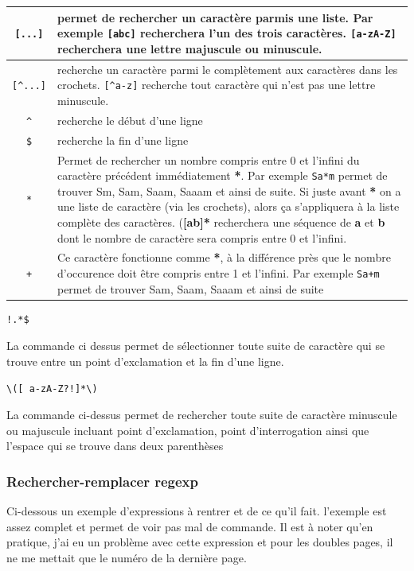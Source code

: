 \documentclass[a4paper,twoside]{article}
\begin{document}
\begin{center}
\begin{tabular}[c]{|c|p{14cm}|}
\verb|[...]| &  permet de rechercher un caractère parmis une liste. Par exemple \verb|[abc]| recherchera l'un des trois caractères. \verb|[a-zA-Z]| recherchera une lettre majuscule ou minuscule.\\ \hline
\verb|[^...]| & recherche un caractère parmi le complètement aux caractères dans les crochets. \verb|[^a-z]| recherche tout caractère qui n'est pas une lettre minuscule. \\ \hline
\verb|^| &  recherche le début d'une ligne\\ \hline
\verb|$| &  recherche la fin d'une ligne\\ \hline
\verb|*| &  Permet de rechercher un nombre compris entre 0 et l'infini du caractère précédent immédiatement \textbf{*}. Par exemple \verb|Sa*m| permet de trouver Sm, Sam, Saam, Saaam et ainsi de suite. Si juste avant \textbf{*} on a une liste de caractère (via les crochets), alors ça s'appliquera à la liste complète des caractères. (\textbf{[ab]*} recherchera une séquence de \textbf{a} et \textbf{b} dont le nombre de caractère sera compris entre 0 et l'infini.\\ \hline
\verb|+| & Ce caractère fonctionne comme \textbf{*}, à la différence près que le nombre d'occurence doit être compris entre 1 et l'infini. Par exemple \verb|Sa+m| permet de trouver Sam, Saam, Saaam et ainsi de suite\\\hline
\end{tabular}
\end{center}


\begin{verbatim}
!.*$
\end{verbatim}

La commande ci dessus permet de sélectionner toute suite de caractère qui se trouve entre un point d'exclamation et la fin d'une ligne.

\begin{verbatim}
\([ a-zA-Z?!]*\)
\end{verbatim}

La commande ci-dessus permet de rechercher toute suite de caractère minuscule ou majuscule incluant point d'exclamation, point d'interrogation ainsi que l'espace qui se trouve dans deux parenthèses

\subsubsection{Rechercher-remplacer regexp}

Ci-dessous un exemple d'expressions à rentrer et de ce qu'il fait. l'exemple est assez complet et permet de voir pas mal de commande. Il est à noter qu'en pratique, j'ai eu un problème avec cette expression et pour les doubles pages, il ne me mettait que le numéro de la dernière page.
\end{document}
